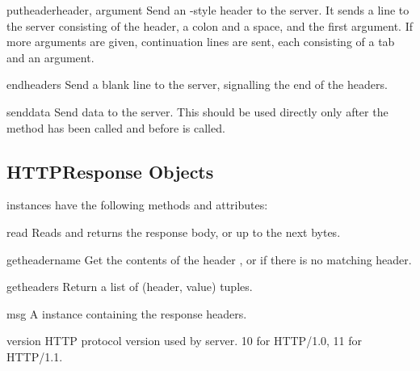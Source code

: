 \begin{methoddesc}{putheader}{header, argument}
Send an -style header to the server.  It sends a line to the
server consisting of the header, a colon and a space, and the first
argument.  If more arguments are given, continuation lines are sent,
each consisting of a tab and an argument.
\end{methoddesc}

\begin{methoddesc}{endheaders}{}
Send a blank line to the server, signalling the end of the headers.
\end{methoddesc}

\begin{methoddesc}{send}{data}
Send data to the server.  This should be used directly only after the
 method has been called and before
 is called.
\end{methoddesc}

\subsection{HTTPResponse Objects \label{httpresponse-objects}}

 instances have the following methods and attributes:

\begin{methoddesc}{read}{}
Reads and returns the response body, or up to the next  bytes.
\end{methoddesc}

\begin{methoddesc}{getheader}{name}
Get the contents of the header , or  if there is no
matching header.
\end{methoddesc}

\begin{methoddesc}{getheaders}{}
Return a list of (header, value) tuples. 
\end{methoddesc}

\begin{datadesc}{msg}
  A  instance containing the response headers.
\end{datadesc}

\begin{datadesc}{version}
  HTTP protocol version used by server.  10 for HTTP/1.0, 11 for HTTP/1.1.
\end{datadesc}

